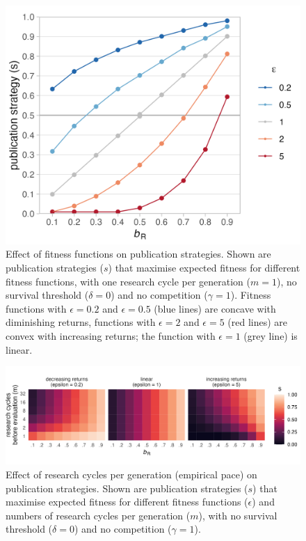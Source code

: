 \documentclass[
]{article}
\begin{document}
\begin{figure}[H]

{\centering \includegraphics[width=0.65\linewidth]{../plots/plot_epsilon_line_EF} 

}

\caption{Effect of fitness functions on publication strategies. Shown are publication strategies ($s$) that maximise expected fitness for different fitness functions, with one research cycle per generation ($m = 1$), no survival threshold ($\delta = 0$) and no competition ($\gamma = 1$). Fitness functions with $\epsilon = 0.2$ and $\epsilon = 0.5$ (blue lines) are concave with diminishing returns, functions with $\epsilon = 2$ and $\epsilon = 5$ (red lines) are convex with increasing returns; the function with $\epsilon = 1$ (grey line) is linear.}\label{fig:A1-epsilonplot}
\end{figure}

\begin{figure}[H]

{\centering \includegraphics[width=\textwidth]{../plots/plot_m_tile_EF} 

}

\caption{Effect of research cycles per generation (empirical pace) on publication strategies. Shown are publication strategies ($s$) that maximise expected fitness for different fitness functions ($\epsilon$) and numbers of research cycles per generation ($m$), with no survival threshold ($\delta = 0$) and no competition ($\gamma = 1$).}\label{fig:A2-mplot}
\end{figure}
\end{document}
